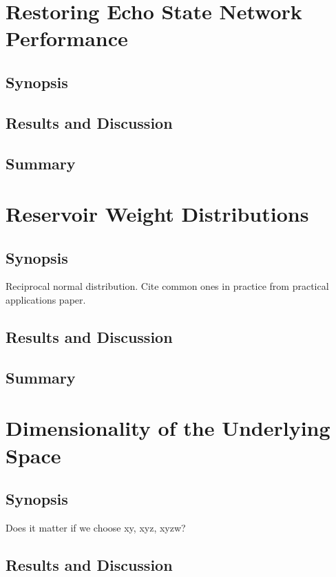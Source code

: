 \section{Restoring Echo State Network Performance}

\subsection{Synopsis}

\subsection{Results and Discussion}

\subsection{Summary}

\section{Reservoir Weight Distributions}

\subsection{Synopsis}

Reciprocal normal distribution. Cite common ones in practice from practical
applications paper.

\subsection{Results and Discussion}

\subsection{Summary}

\section{Dimensionality of the Underlying Space}

\subsection{Synopsis}

Does it matter if we choose xy, xyz, xyzw?

\subsection{Results and Discussion}

